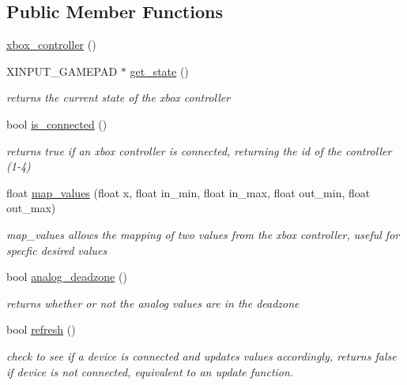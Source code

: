 \subsection*{Public Member Functions}
\begin{DoxyCompactItemize}
\item 
\hyperlink{classoctet_1_1xbox__controller_a23dae5b93d48b45fee3d992b1afed77b}{xbox\+\_\+controller} ()
\item 
X\+I\+N\+P\+U\+T\+\_\+\+G\+A\+M\+E\+P\+A\+D $\ast$ \hyperlink{classoctet_1_1xbox__controller_a3a2a6b8a5ab904bf5bbb20538a7326ce}{get\+\_\+state} ()
\begin{DoxyCompactList}\small\item\em returns the current state of the xbox controller \end{DoxyCompactList}\item 
bool \hyperlink{classoctet_1_1xbox__controller_ab6fc7aad7d4c37e56511bb87dff70459}{is\+\_\+connected} ()
\begin{DoxyCompactList}\small\item\em returns true if an xbox controller is connected, returning the id of the controller (1-\/4) \end{DoxyCompactList}\item 
float \hyperlink{classoctet_1_1xbox__controller_aaf78537caeec8411d12a39a7c2f6b90c}{map\+\_\+values} (float x, float in\+\_\+min, float in\+\_\+max, float out\+\_\+min, float out\+\_\+max)
\begin{DoxyCompactList}\small\item\em map\+\_\+values allows the mapping of two values from the xbox controller, useful for specfic desired values \end{DoxyCompactList}\item 
bool \hyperlink{classoctet_1_1xbox__controller_a374fc9fd466a1155b44432eef1179073}{analog\+\_\+deadzone} ()
\begin{DoxyCompactList}\small\item\em returns whether or not the analog values are in the deadzone \end{DoxyCompactList}\item 
bool \hyperlink{classoctet_1_1xbox__controller_afa8298b80294785c3b320ccc6c6e51bd}{refresh} ()
\begin{DoxyCompactList}\small\item\em check to see if a device is connected and updates values accordingly, returns false if device is not connected, equivalent to an update function. \end{DoxyCompactList}\end{DoxyCompactItemize}
